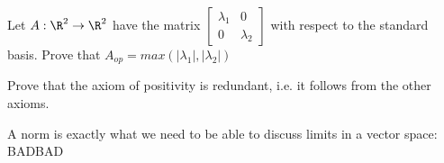 	\begin{question}
		Let $A: \R^2 \to \R^2$ have the matrix $\begin{bmatrix} \lambda_1 & 0 \\ 0 & \lambda_2\end{bmatrix}$ with respect to the standard basis.  Prove that
		$A_{op} = max(|\lambda_1|,|\lambda_2|)$
	\end{question}
	
	\begin{question}
		Prove that the axiom of positivity is redundant, i.e. it follows from the other axioms.
	\end{question}
	
	A norm is exactly what we need to be able to discuss limits in a vector space:
	BADBAD
	
	
	
	
